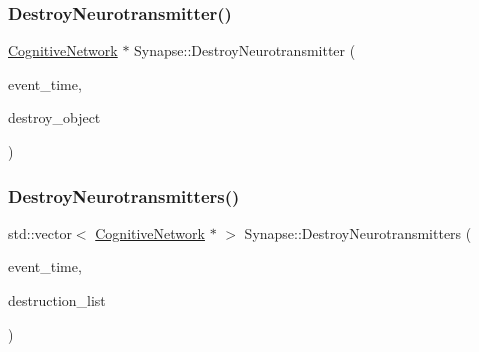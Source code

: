 \mbox{\label{classSynapse_a8d53488bdd8f0bd97216e5d388df35b8}} 
\subsubsection{\texorpdfstring{Destroy\+Neurotransmitter()}{DestroyNeurotransmitter()}}
{\footnotesize\ttfamily \mbox{\hyperlink{classCognitiveNetwork}{Cognitive\+Network}} $\ast$ Synapse\+::\+Destroy\+Neurotransmitter (\begin{DoxyParamCaption}\item[{std\+::chrono\+::time\+\_\+point$<$ \mbox{\hyperlink{universe_8h_a0ef8d951d1ca5ab3cfaf7ab4c7a6fd80}{Clock}} $>$}]{event\+\_\+time,  }\item[{\mbox{\hyperlink{classCognitiveNetwork}{Cognitive\+Network}} $\ast$}]{destroy\+\_\+object }\end{DoxyParamCaption})}

\mbox{\label{classSynapse_a58c882f356bc34c66a7cd2b345532ec9}} 
\subsubsection{\texorpdfstring{Destroy\+Neurotransmitters()}{DestroyNeurotransmitters()}}
{\footnotesize\ttfamily std\+::vector$<$ \mbox{\hyperlink{classCognitiveNetwork}{Cognitive\+Network}} $\ast$ $>$ Synapse\+::\+Destroy\+Neurotransmitters (\begin{DoxyParamCaption}\item[{std\+::chrono\+::time\+\_\+point$<$ \mbox{\hyperlink{universe_8h_a0ef8d951d1ca5ab3cfaf7ab4c7a6fd80}{Clock}} $>$}]{event\+\_\+time,  }\item[{std\+::vector$<$ \mbox{\hyperlink{classCognitiveNetwork}{Cognitive\+Network}} $\ast$$>$}]{destruction\+\_\+list }\end{DoxyParamCaption})}

\mbox{\label{classSynapse_ad9a7225ede0ce4f64ecea9bc9cb49e20}} 
